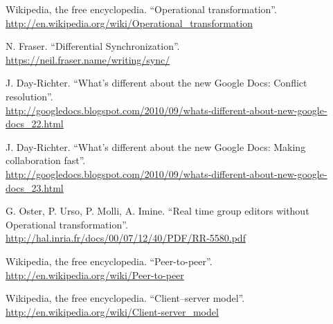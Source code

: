 \documentclass[a4paper, 12pt, twoside]{book}
\begin{document}
\begin{thebibliography}{99}
 Wikipedia, the free encyclopedia. “Operational transformation”.
\\\url{http://en.wikipedia.org/wiki/Operational_transformation}

 N. Fraser. “Differential Synchronization”.
\\\url{https://neil.fraser.name/writing/sync/}

 J. Day-Richter. “What’s different about the new Google Docs: Conflict resolution”.
\\\url{http://googledocs.blogspot.com/2010/09/whats-different-about-new-google-docs_22.html}

 J. Day-Richter. “What’s different about the new Google Docs: Making collaboration fast”.
\\\url{http://googledocs.blogspot.com/2010/09/whats-different-about-new-google-docs_23.html}

 G. Oster, P. Urso, P. Molli, A. Imine. “Real time group editors without Operational transformation”.
\\\url{http://hal.inria.fr/docs/00/07/12/40/PDF/RR-5580.pdf}

 Wikipedia, the free encyclopedia. “Peer-to-peer”.
\\\url{http://en.wikipedia.org/wiki/Peer-to-peer}

 Wikipedia, the free encyclopedia. “Client–server model”.
\\\url{http://en.wikipedia.org/wiki/Client-server_model}

\end{thebibliography}

\end{document}
